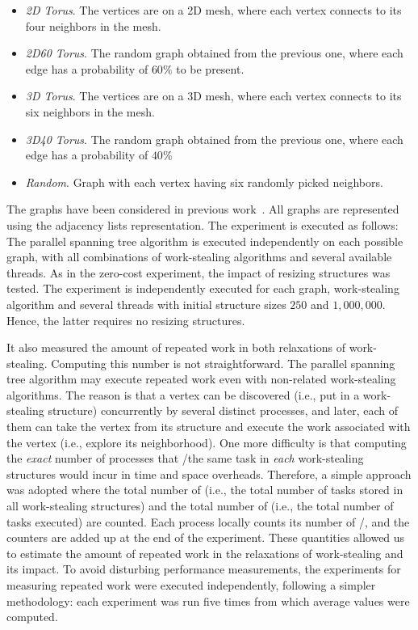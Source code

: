 \begin{itemize}
    \item \textit{2D Torus}. The vertices are on a 2D mesh, where each vertex connects to its four neighbors in the mesh.
    \item \textit{2D60 Torus}. The random graph obtained from the previous one, where each edge has a probability of $60\%$
to be present.
    \item \textit{3D Torus}. The vertices are on a 3D mesh, where each vertex connects to its six neighbors in the mesh.
    \item \textit{3D40 Torus}. The random graph obtained from the previous one, where each edge has a probability of $40\%$
    \item \textit{Random}. Graph with each vertex having six randomly picked neighbors.
\end{itemize}


The graphs have been considered in previous work~\cite{1302951, maged.vechev.2009, fencefreework}.  All graphs are represented using the adjacency lists representation. The experiment is executed as follows: The parallel spanning tree algorithm is executed independently on each possible graph, with all combinations of work-stealing algorithms and several available threads.  As in the zero-cost experiment, the impact of resizing structures was tested. The experiment is independently executed for each graph, work-stealing algorithm and several threads with initial structure sizes $250$ and $1,000,000$. Hence, the latter requires no resizing structures.

It also measured the amount of repeated work in both relaxations of work-stealing.  Computing this number is not straightforward.  The parallel spanning tree algorithm may execute repeated work even with non-related work-stealing algorithms. The reason is that a vertex can be discovered (i.e., put in a work-stealing structure) concurrently by several distinct processes, and later, each of them can take the vertex from its structure and execute the work associated with the vertex (i.e., explore its neighborhood).  One more difficulty is that computing the \emph{exact} number of processes that \Take/\Steal the same task in \emph{each} work-stealing structures would incur in time and space overheads.  Therefore, a simple approach was adopted where the total number of \Puts (i.e., the total number of tasks stored in all work-stealing structures) and the total number of \Takes (i.e., the total number of tasks executed) are counted.  Each process locally counts its number of \Puts/\Takes, and the counters are added up at the end of the experiment.  These quantities allowed us to estimate the amount of repeated work in the relaxations of work-stealing and its impact.  To avoid disturbing performance measurements, the experiments for measuring repeated work were executed independently, following a simpler methodology: each experiment was run five times from which average values were computed.

